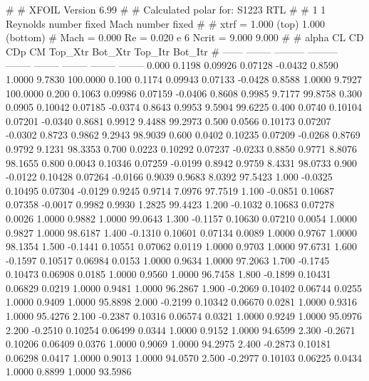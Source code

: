 #  
#       XFOIL         Version 6.99
#  
# Calculated polar for: S1223 RTL                                       
#  
# 1 1 Reynolds number fixed          Mach number fixed         
#  
# xtrf =   1.000 (top)        1.000 (bottom)  
# Mach =   0.000     Re =     0.020 e 6     Ncrit =   9.000  9.000
#  
#   alpha    CL        CD       CDp       CM     Top_Xtr  Bot_Xtr  Top_Itr  Bot_Itr
#  ------ -------- --------- --------- -------- -------- -------- -------- --------
   0.000   0.1198   0.09926   0.07128  -0.0432   0.8590   1.0000   9.7830 100.0000
   0.100   0.1174   0.09943   0.07133  -0.0428   0.8588   1.0000   9.7927 100.0000
   0.200   0.1063   0.09986   0.07159  -0.0406   0.8608   0.9985   9.7177  99.8758
   0.300   0.0905   0.10042   0.07185  -0.0374   0.8643   0.9953   9.5904  99.6225
   0.400   0.0740   0.10104   0.07201  -0.0340   0.8681   0.9912   9.4488  99.2973
   0.500   0.0566   0.10173   0.07207  -0.0302   0.8723   0.9862   9.2943  98.9039
   0.600   0.0402   0.10235   0.07209  -0.0268   0.8769   0.9792   9.1231  98.3353
   0.700   0.0223   0.10292   0.07237  -0.0233   0.8850   0.9771   8.8076  98.1655
   0.800   0.0043   0.10346   0.07259  -0.0199   0.8942   0.9759   8.4331  98.0733
   0.900  -0.0122   0.10428   0.07264  -0.0166   0.9039   0.9683   8.0392  97.5423
   1.000  -0.0325   0.10495   0.07304  -0.0129   0.9245   0.9714   7.0976  97.7519
   1.100  -0.0851   0.10687   0.07358  -0.0017   0.9982   0.9930   1.2825  99.4423
   1.200  -0.1032   0.10683   0.07278   0.0026   1.0000   0.9882   1.0000  99.0643
   1.300  -0.1157   0.10630   0.07210   0.0054   1.0000   0.9827   1.0000  98.6187
   1.400  -0.1310   0.10601   0.07134   0.0089   1.0000   0.9767   1.0000  98.1354
   1.500  -0.1441   0.10551   0.07062   0.0119   1.0000   0.9703   1.0000  97.6731
   1.600  -0.1597   0.10517   0.06984   0.0153   1.0000   0.9634   1.0000  97.2063
   1.700  -0.1745   0.10473   0.06908   0.0185   1.0000   0.9560   1.0000  96.7458
   1.800  -0.1899   0.10431   0.06829   0.0219   1.0000   0.9481   1.0000  96.2867
   1.900  -0.2069   0.10402   0.06744   0.0255   1.0000   0.9409   1.0000  95.8898
   2.000  -0.2199   0.10342   0.06670   0.0281   1.0000   0.9316   1.0000  95.4276
   2.100  -0.2387   0.10316   0.06574   0.0321   1.0000   0.9249   1.0000  95.0976
   2.200  -0.2510   0.10254   0.06499   0.0344   1.0000   0.9152   1.0000  94.6599
   2.300  -0.2671   0.10206   0.06409   0.0376   1.0000   0.9069   1.0000  94.2975
   2.400  -0.2873   0.10181   0.06298   0.0417   1.0000   0.9013   1.0000  94.0570
   2.500  -0.2977   0.10103   0.06225   0.0434   1.0000   0.8899   1.0000  93.5986
